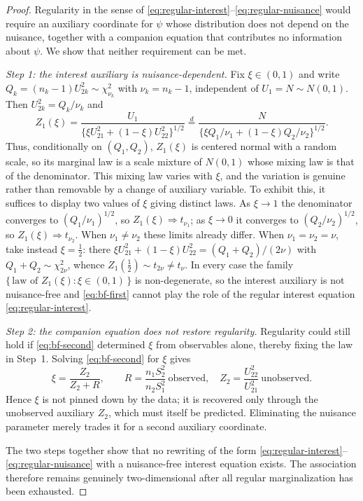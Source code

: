 \documentclass[12pt]{article}
\begin{document}
\begin{proof}
Regularity in the sense of
\eqref{eq:regular-interest}--\eqref{eq:regular-nuisance} would require an
auxiliary coordinate for \(\psi\) whose distribution does not depend on the
nuisance, together with a companion equation that contributes no information
about \(\psi\).  We show that neither requirement can be met.

\emph{Step 1: the interest auxiliary is nuisance-dependent.}
Fix \(\xi\in(0,1)\) and write \(Q_k=(n_k-1)U_{2k}^2\sim\chi^2_{\nu_k}\) with
\(\nu_k=n_k-1\), independent of \(U_1=N\sim N(0,1)\).  Then \(U_{2k}^2=Q_k/\nu_k\)
and
\[
Z_1(\xi)
=
\frac{U_1}{\{\xi U_{21}^2+(1-\xi)U_{22}^2\}^{1/2}}
\overset{d}{=}
\frac{N}{\{\xi Q_1/\nu_1+(1-\xi)Q_2/\nu_2\}^{1/2}} .
\]
Thus, conditionally on \((Q_1,Q_2)\), \(Z_1(\xi)\) is centered normal with a
random scale, so its marginal law is a scale mixture of \(N(0,1)\) whose mixing
law is that of the denominator.  This mixing law varies with \(\xi\), and the
variation is genuine rather than removable by a change of auxiliary variable.
To exhibit this, it suffices to display two values of \(\xi\) giving distinct
laws.  As \(\xi\to1\) the denominator converges to \((Q_1/\nu_1)^{1/2}\), so
\(Z_1(\xi)\Rightarrow t_{\nu_1}\); as \(\xi\to0\) it converges to
\((Q_2/\nu_2)^{1/2}\), so \(Z_1(\xi)\Rightarrow t_{\nu_2}\).  When
\(\nu_1\neq\nu_2\) these limits already differ.  When \(\nu_1=\nu_2=\nu\), take
instead \(\xi=\tfrac12\): there \(\xi U_{21}^2+(1-\xi)U_{22}^2=(Q_1+Q_2)/(2\nu)\)
with \(Q_1+Q_2\sim\chi^2_{2\nu}\), whence \(Z_1(\tfrac12)\sim t_{2\nu}\neq
t_{\nu}\).  In every case the family \(\{\,\text{law of }Z_1(\xi):\xi\in(0,1)\,\}\)
is non-degenerate, so the interest auxiliary is not nuisance-free and
\eqref{eq:bf-first} cannot play the role of the regular interest equation
\eqref{eq:regular-interest}.

\emph{Step 2: the companion equation does not restore regularity.}
Regularity could still hold if \eqref{eq:bf-second} determined \(\xi\) from
observables alone, thereby fixing the law in Step~1.  Solving
\eqref{eq:bf-second} for \(\xi\) gives
\[
\xi=\frac{Z_2}{Z_2+R},
\qquad
R=\frac{n_1S_2^2}{n_2S_1^2}\ \text{observed},\quad
Z_2=\frac{U_{22}^2}{U_{21}^2}\ \text{unobserved}.
\]
Hence \(\xi\) is not pinned down by the data; it is recovered only through the
unobserved auxiliary \(Z_2\), which must itself be predicted.  Eliminating the
nuisance parameter merely trades it for a second auxiliary coordinate.

The two steps together show that no rewriting of the form
\eqref{eq:regular-interest}--\eqref{eq:regular-nuisance} with a nuisance-free
interest equation exists.  The association therefore remains genuinely
two-dimensional after all regular marginalization has been exhausted.
\end{proof}
\end{document}

